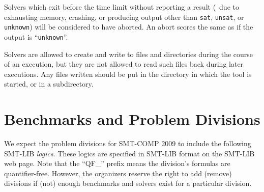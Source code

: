 \documentclass[12pt]{article}
\begin{document}
Solvers which exit before the time
limit without reporting a result (\ie\ due to exhausting memory, crashing,
or producing output other than \texttt{sat}, \texttt{unsat}, or
\texttt{unknown})
will be considered to have aborted.  An abort scores the same as if
the output is ``\texttt{unknown}''.

Solvers are allowed to create and write to
files and directories during the course of an execution, but they are
not allowed to read such files back during later executions.  Any
files written should be put in the directory in which the tool is
started, or in a subdirectory.  

\section{Benchmarks and Problem Divisions}
\label{sec:theories}

We expect the problem divisions for SMT-COMP 2009 to include the following
SMT-LIB \emph{logics}.  These logics are specified in SMT-LIB format on the
SMT-LIB web page.  Note that the ``QF\_'' prefix means the division's
formulas are quantifier-free.  However, the organizers reserve the right to add
(remove) divisions if (not) enough benchmarks and solvers exist for a
particular division.
\end{document}
